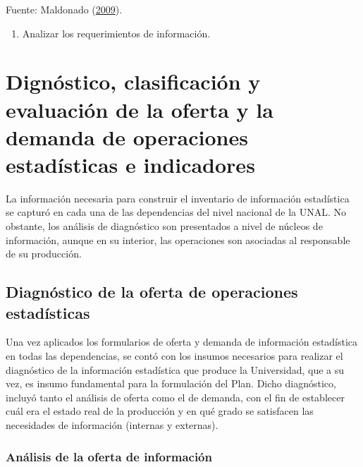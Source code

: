 \documentclass[
]{book}
\providecommand{\tightlist}{%
  \setlength{\itemsep}{0pt}\setlength{\parskip}{0pt}}
\begin{document}
Fuente: Maldonado (\protect\hyperlink{ref-maldonado2009metodologia}{2009}).

\begin{enumerate}
\def\labelenumi{\alph{enumi}.}
\setcounter{enumi}{2}
\tightlist
\item
  Analizar los requerimientos de información.
\end{enumerate}

\hypertarget{dignuxf3stico-clasificaciuxf3n-y-evaluaciuxf3n-de-la-oferta-y-la-demanda-de-operaciones-estaduxedsticas-e-indicadores}{%
\chapter{Dignóstico, clasificación y evaluación de la oferta y la demanda de operaciones estadísticas e indicadores}\label{dignuxf3stico-clasificaciuxf3n-y-evaluaciuxf3n-de-la-oferta-y-la-demanda-de-operaciones-estaduxedsticas-e-indicadores}}

La información necesaria para construir el inventario de información estadística se capturó en
cada una de las dependencias del nivel nacional de la UNAL. No obstante, los análisis de diagnóstico
son presentados a nivel de núcleos de información, aunque en su interior, las operaciones son
asociadas al responsable de su producción.

\hypertarget{diagnuxf3stico-de-la-oferta-de-operaciones-estaduxedsticas-1}{%
\section{Diagnóstico de la oferta de operaciones estadísticas}\label{diagnuxf3stico-de-la-oferta-de-operaciones-estaduxedsticas-1}}

Una vez aplicados los formularios de oferta y demanda de información estadística en todas las
dependencias, se contó con los insumos necesarios para realizar el diagnóstico de la información
estadística que produce la Universidad, que a su vez, es insumo fundamental para la formulación del
Plan. Dicho diagnóstico, incluyó tanto el análisis de oferta como el de demanda, con el fin de
establecer cuál era el estado real de la producción y en qué grado se satisfacen las necesidades de
información (internas y externas).

\hypertarget{anuxe1lisis-de-la-oferta-de-informaciuxf3n-1}{%
\subsection{Análisis de la oferta de información}\label{anuxe1lisis-de-la-oferta-de-informaciuxf3n-1}}
\end{document}

